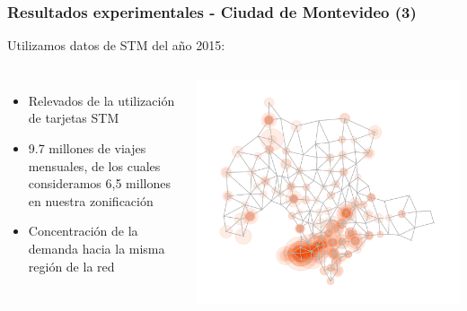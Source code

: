 \documentclass[aspectratio=43, 10pt]{beamer}
\begin{document}
\begin{frame}
    \frametitle{Resultados experimentales - Ciudad de Montevideo (3)}

    Utilizamos datos de STM del año 2015:
    \begin{columns}[T]
        \begin{itemize}
            \item{Relevados de la utilización de tarjetas STM}
            \item{9.7 millones de viajes mensuales, de los cuales consideramos 6,5 millones en nuestra zonificación}
            \item{Concentración de la demanda hacia la misma región de la red}
        \end{itemize}
            \includegraphics[width=\textwidth]{images/mdeo_demand_topN.png}
    \end{columns}
\end{frame}
\end{document}
